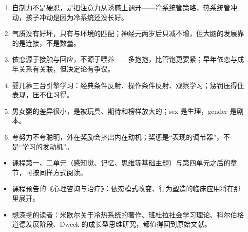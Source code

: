 \documentclass[UTF8,a4paper,11pt]{ctexart}
\begin{document}
\vspace{1em}
\begin{keyconcept}
\begin{enumerate}
  \item 自制力不是硬忍，是把注意力从诱惑上调开——冷系统管策略，热系统管冲动，孩子冲动是因为冷系统还没长好。
  \item 气质没有好坏，只有与环境的匹配；神经元两岁后只减不增，但大脑的发展靠的是连接，不是数量。
  \item 依恋源于接触与回应，不源于喂养——多抱抱，比管饱更要紧；早年依恋与成年关系有关联，但决定论有争议。
  \item 婴儿靠三台引擎学习：经典条件反射、操作条件反射、观察学习；惩罚压得住表现，压不住习得。
  \item 男女婴的差异很小，是被玩具、期待和榜样放大的；sex 是生理，gender 是剧本。
  \item 夸努力不夸聪明，外在奖励会挤出内在动机；奖惩是“表现的调节器”，不是“学习的发动机”。
\end{enumerate}
\end{keyconcept}

\begin{calcbox}
\begin{itemize}
  \item 课程第一、二单元（感知觉、记忆、思维等基础主题）与第四单元之后的章节，可按同样方式阅读。
  \item 课程预告的《心理咨询与治疗》：依恋模式改变、行为塑造的临床应用将在那里展开。
  \item 想深挖的读者：米歇尔关于冷热系统的著作、班杜拉社会学习理论、科尔伯格道德发展阶段、Dweck 的成长型思维研究，都值得回到原始文献。
\end{itemize}
\end{calcbox}
\end{document}
